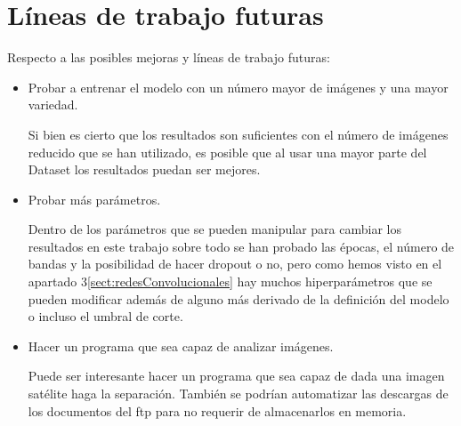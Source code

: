 \section{Líneas de trabajo futuras}\label{sect:lineasFuturas}
Respecto a las posibles mejoras y líneas de trabajo futuras:
\begin{itemize}
	\item Probar a entrenar el modelo con un número mayor de imágenes y una mayor variedad.
	
	Si bien es cierto que los resultados son suficientes con el número de imágenes reducido que se han utilizado, es posible que al usar una mayor parte del Dataset los resultados puedan ser mejores.
	
	\item Probar más parámetros.
	
	Dentro de los parámetros que se pueden manipular para cambiar los resultados en este trabajo sobre todo se han probado las épocas, el número de bandas y la posibilidad de hacer dropout o no, pero como hemos visto en el apartado 3\ref*{sect:redesConvolucionales} hay muchos hiperparámetros que se pueden modificar además de alguno más derivado de la definición del modelo o incluso el umbral de corte.

	\item Hacer un programa que sea capaz de analizar imágenes.
	
	Puede ser interesante hacer un programa que sea capaz de dada una imagen satélite haga la separación. También se podrían automatizar las descargas de los documentos del ftp para no requerir de almacenarlos en memoria.
		
\end{itemize}